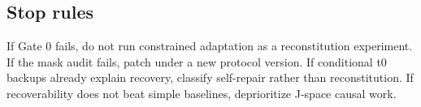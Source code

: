 \subsection{Stop rules}\label{stop-rules}

If Gate 0 fails, do not run constrained adaptation as a reconstitution experiment. If the mask audit fails, patch under a new protocol version. If conditional t0 backups already explain recovery, classify self-repair rather than reconstitution. If recoverability does not beat simple baselines, deprioritize J-space causal work.
